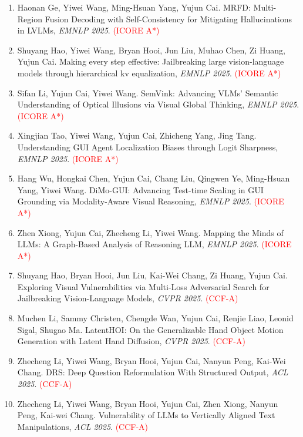 \begin{enumerate}
\item Haonan Ge, Yiwei Wang, Ming-Hsuan Yang, Yujun Cai. MRFD: Multi-Region Fusion Decoding with Self-Consistency for Mitigating Hallucinations in LVLMs, \textit{EMNLP 2025}. \textcolor{red}{(ICORE A*)}

\item Shuyang Hao, Yiwei Wang, Bryan Hooi, Jun Liu, Muhao Chen, Zi Huang, Yujun Cai. Making every step effective: Jailbreaking large vision-language models through hierarchical kv equalization, \textit{EMNLP 2025}. \textcolor{red}{(ICORE A*)}

\item Sifan Li, Yujun Cai, Yiwei Wang. SemVink: Advancing VLMs' Semantic Understanding of Optical Illusions via Visual Global Thinking, \textit{EMNLP 2025}. \textcolor{red}{(ICORE A*)}

\item Xingjian Tao, Yiwei Wang, Yujun Cai, Zhicheng Yang, Jing Tang. Understanding GUI Agent Localization Biases through Logit Sharpness, \textit{EMNLP 2025}. \textcolor{red}{(ICORE A*)}

\item Hang Wu, Hongkai Chen, Yujun Cai, Chang Liu, Qingwen Ye, Ming-Hsuan Yang, Yiwei Wang. DiMo-GUI: Advancing Test-time Scaling in GUI Grounding via Modality-Aware Visual Reasoning, \textit{EMNLP 2025}. \textcolor{red}{(ICORE A*)}

\item Zhen Xiong, Yujun Cai, Zhecheng Li, Yiwei Wang. Mapping the Minds of LLMs: A Graph-Based Analysis of Reasoning LLM, \textit{EMNLP 2025}. \textcolor{red}{(ICORE A*)}

\item Shuyang Hao, Bryan Hooi, Jun Liu, Kai-Wei Chang, Zi Huang, Yujun Cai. Exploring Visual Vulnerabilities via Multi-Loss Adversarial Search for Jailbreaking Vision-Language Models, \textit{CVPR 2025}. \textcolor{red}{(CCF-A)}

\item Muchen Li, Sammy Christen, Chengde Wan, Yujun Cai, Renjie  Liao, Leonid Sigal, Shugao Ma. LatentHOI: On the Generalizable Hand Object Motion Generation with Latent Hand Diffusion, \textit{CVPR 2025}. \textcolor{red}{(CCF-A)}

\item Zhecheng Li, Yiwei Wang, Bryan Hooi, Yujun Cai, Nanyun Peng, Kai-Wei Chang. DRS: Deep Question Reformulation With Structured Output, \textit{ACL 2025}. \textcolor{red}{(CCF-A)}

\item Zhecheng Li, Yiwei Wang, Bryan Hooi, Yujun Cai, Zhen Xiong, Nanyun Peng, Kai-wei Chang. Vulnerability of LLMs to Vertically Aligned Text Manipulations, \textit{ACL 2025}. \textcolor{red}{(CCF-A)}


\end{enumerate}
